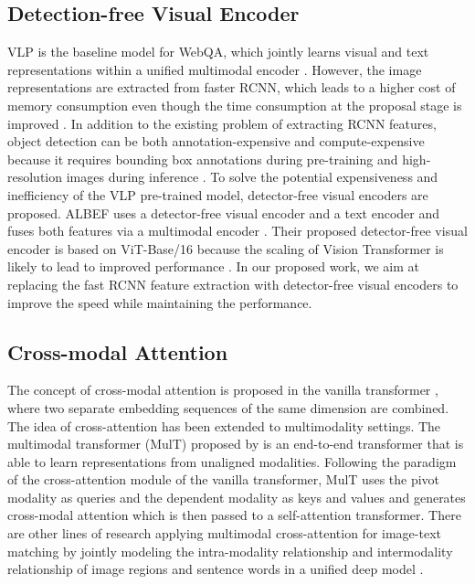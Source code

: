 \documentclass[nohyperref]{article}
\theoremstyle{plain}
\theoremstyle{definition}
\theoremstyle{remark}
\begin{document}
\subsection{Detection-free Visual Encoder}
VLP is the baseline model for WebQA, which jointly learns visual and text representations within a unified multimodal encoder \citep{vlp}. However, the image representations are extracted from faster RCNN, which leads to a higher cost of memory consumption even though the time consumption at the proposal stage is improved \citep{rcnn}. In addition to the existing problem of extracting RCNN features, object detection can be both annotation-expensive and compute-expensive because it requires bounding box annotations during pre-training and high-resolution images during inference \citep{albef}. To solve the potential expensiveness and inefficiency of the VLP pre-trained model, detector-free visual encoders are proposed. ALBEF uses a detector-free visual encoder and a text encoder and fuses both features via a multimodal encoder \citep{albef}. Their proposed detector-free visual encoder is based on ViT-Base/16 because the scaling of Vision Transformer is likely to lead to improved performance \citep{vit}. In our proposed work, we aim at replacing the fast RCNN feature extraction with detector-free visual encoders to improve the speed while maintaining the performance.

\subsection{Cross-modal Attention}
The concept of cross-modal attention is proposed in the vanilla transformer \citep{transformer}, where two separate embedding sequences of the same dimension are combined. The idea of cross-attention has been extended to multimodality settings. The multimodal transformer (MulT) proposed by \citet{mult} is an end-to-end transformer that is able to learn representations from unaligned modalities. Following the paradigm of the cross-attention module of the vanilla transformer, MulT uses the pivot modality as queries and the dependent modality as keys and values and generates cross-modal attention which is then passed to a self-attention transformer. There are other lines of research applying multimodal cross-attention for image-text matching by jointly modeling the intra-modality relationship and intermodality relationship of image regions and sentence words in a unified deep model \citep{itm-cross}. 
\end{document}

